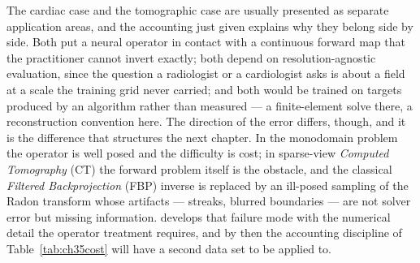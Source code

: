 

The cardiac case and the tomographic case are usually presented as separate
application areas, and the accounting just given explains why they belong side by
side. Both put a neural operator in contact with a continuous forward map that
the practitioner cannot invert exactly; both depend on resolution-agnostic
evaluation, since the question a radiologist or a cardiologist asks is about a
field at a scale the training grid never carried; and both would be trained on
targets produced by an algorithm rather than measured --- a finite-element solve
there, a reconstruction convention here. The direction of the error differs,
though, and it is the difference that structures the next chapter. In the
monodomain problem the operator is well posed and the difficulty is cost; in
sparse-view \emph{Computed Tomography} (CT) the forward problem itself is the
obstacle, and the classical \emph{Filtered Backprojection} (FBP) inverse is
replaced by an ill-posed sampling of the Radon transform whose artifacts --- streaks,
blurred boundaries --- are not solver error but missing information.
 develops that
failure mode with the numerical detail the operator treatment requires, and by
then the accounting discipline of Table~\ref{tab:ch35cost} will have a second
data set to be applied to.

